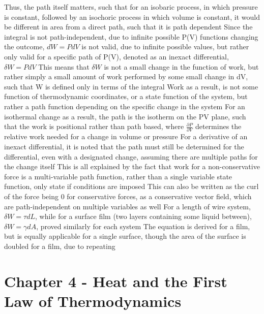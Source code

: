 \begin{outline*}
\3 Thus, the path itself matters, such that for an isobaric process, in which pressure is constant, followed by an isochoric process in which volume is constant, it would be different in area from a direct path, such that it is path dependent
\3 Since the integral is not path-independent, due to infinite possible P(V) functions changing the outcome, $dW = PdV$ is not valid, due to infinite possible values, but rather only valid for a  specific path of P(V), denoted as an inexact differential, $\delta W = PdV$
\4 This means that $\delta W$ is not a small change in the function of work, but rather simply a small amount of work performed by some small change in dV, such that W is defined only in terms of the integral
\4 Work as a result, is not some function of thermodynamic coordinates, or a state function of the system, but rather a path function depending on the specific change in the system
\4 For an isothermal change as a result, the path is the isotherm on the PV plane, such that the work is positional rather than path based, where $\frac {\partial P}{\partial V}$ determines the relative work needed for a change in volume or pressure
\4 For a derivative of an inexact differential, it is noted that the path must still be determined for the differential, even with a designated change, assuming there are multiple paths for the change itself
\2 This is all explained by the fact that work for a non-conservative force is a multi-variable path function, rather than a single variable state function, only state if conditions are imposed
\3 This can also be written as the curl of the force being 0 for conservative forces, as a conservative vector field, which are path-independent on multiple variables as well
\1 For a length of wire system, $\delta W = \tau dL$, while for a surface film (two layers containing some liquid between), $\delta W = \gamma dA$, proved similarly for each system
\2 The equation is derived for a film, but is equally applicable for a single surface, though the area of the surface is doubled for a film, due to repeating
\end{outline*}
\section{Chapter 4 - Heat and the First Law of Thermodynamics}
